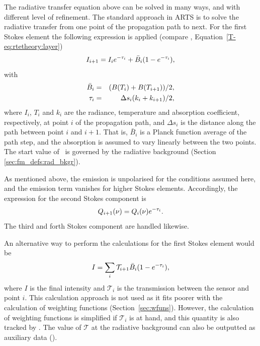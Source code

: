 The radiative transfer equation above can be solved in many ways, and with
different level of refinement. The standard approach in ARTS is to solve the
radiative transfer from one point of the propagation path to next. For the
first Stokes element the following expression is applied (compare \theory,
Equation~\ref{T-eq:rtetheory:layer})
\begin{equation}
  \label{eq:fm_defs:rte_step}
  I_{i+1} = I_ie^{-\tau_{i}} + \bar{B}_i(1-e^{-\tau_{i}}),
\end{equation}
with
\begin{eqnarray}
  \bar{B}_i &=& (B(T_i)+B(T_{i+1}))/2, \\
  \tau_{i} &=& \Delta s_i(k_i+k_{i+1})/2, 
  \label{eq:taustep}
\end{eqnarray}
where $I_i$, $T_i$ and $k_i$ are the radiance, temperature and absorption
coefficient, respectively, at point $i$ of the propagation path, and $\Delta
s_i$ is the distance along the path between point $i$ and $i+1$. That is,
$\bar{B}_i$ is a Planck function average of the path step, and the absorption
is assumed to vary linearly between the two points. The start value of \Mpi\ is
governed by the radiative background (Section \ref{sec:fm_defs:rad_bkgr}).

As mentioned above, the emission is unpolarised for the conditions assumed
here, and the emission term vanishes for higher Stokes elements. Accordingly,
the expression for the second Stokes component is
\begin{equation}
  Q_{i+1}(\nu) = Q_i(\nu)e^{-\tau_{i}}.
  \label{eq:fm_defs:rte_step2}
\end{equation}
The third and forth Stokes component are handled likewise.

An alternative way to perform the calculations for the first Stokes element
would be
\begin{equation}
  \label{eq:fm_defs:rte_alt}
  I = \sum_i \mathcal{T}_{i+1} \bar{B}_i(1-e^{-\tau_{i}}),
\end{equation}
where $I$ is the final intensity and $\mathcal{T}_i$ is the transmission
between the sensor and point $i$. This calculation approach is not used as it
fits poorer with the calculation of weighting functions
(Section~\ref{sec:wfuns}). However, the calculation of weighting functions is
simplified if $\mathcal{T}_i$ is at hand, and this quantity is also tracked by
. The value of $\mathcal{T}$ at the
radiative background can also be outputted as auxiliary data
().

